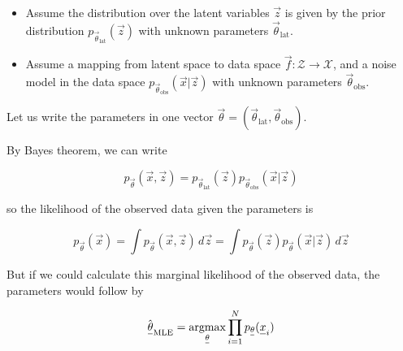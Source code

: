 \begin{itemize}
    \item Assume the distribution over the latent variables $\vec{z}$ is given
    by the prior distribution $p_{\vec{\theta}_{\text{lat}}}(\vec{z})$ with unknown parameters
    $\vec{\theta}_{\text{lat}}$.
    \item Assume a mapping from latent space to data space $\vec{f}: \mathcal{Z} \rightarrow \mathcal{X}$,
    and a noise model in the data space $p_{\vec{\theta}_{\text{obs}}}(\vec{x} | \vec{z})$ with unknown parameters
    $\vec{\theta}_{\text{obs}}$.
\end{itemize}

Let us write the parameters in one vector $\vec{\theta} = (\vec{\theta}_{\text{lat}}, \vec{\theta}_{\text{obs}})$.



By Bayes theorem, we can write

\begin{equation}
    p_\vec{\theta}(\vec{x},\vec{z}) = p_{\vec{\theta}_{\text{lat}}}(\vec{z}) p_{\vec{\theta}_{\text{obs}}}(\vec{x} | \vec{z})
\end{equation}

so the likelihood of the observed data given the parameters is

\begin{equation}
    p_\vec{\theta}(\vec{x}) = \int p_\vec{\theta}(\vec{x}, \vec{z}) \, d\vec{z} = \int p_{\vec{\theta}}(\vec{z}) p_{\vec{\theta}}(\vec{x} | \vec{z}) \, d\vec{z}
\end{equation}


But if we could calculate this marginal likelihood of the observed data,
the parameters would follow by

\begin{equation}
    \hat{\vec{\theta}}_{\text{MLE}} = \argmax_{\vec{\theta}} \prod_{i=1}^{N} p_{\vec{\theta}}(\vec{x}_i)
\end{equation}

